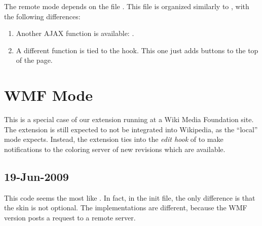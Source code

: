 The remote mode depends on the file .
This file is organized similarly to ,
with the following differences:
\begin{enumerate}
\item Another AJAX function is available: .
\item A different function is tied to the  hook.  This one just adds buttons to the top of the page.
\end{enumerate}

\section{WMF Mode}

This is a special case of our extension running at a Wiki Media Foundation site.
The extension is still expected to not be integrated into Wikipedia,
as the ``local'' mode expects.
Instead, the extension ties into the \textit{edit hook} of
 to make notifications to the coloring server
of new revisions which are available.

\subsection{19-Jun-2009}

This code seems the most like .
In fact, in the init file, the only difference is that the skin is not optional.
The implementations are different, because the WMF version posts
a request to a remote server.

